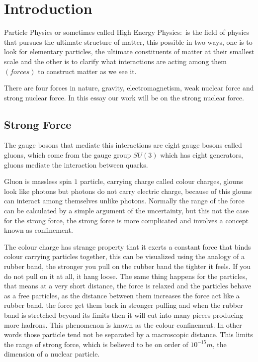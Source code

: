 \chapter{Introduction}
Particle Physics or sometimes called High Energy Physics$:$ is the field of physics that pursues the ultimate structure of matter, this possible in two ways, one is to look for elementary particles, the ultimate constituents of matter at their smallest scale and the other is to clarify what interactions are acting among them $(forces)$ to construct matter as we see it.
 
There are four forces in nature, gravity, electromagnetism, weak nuclear force and strong nuclear force. In this essay our work will be on the strong nuclear force. 

\section{Strong Force}
The gauge bosons that mediate this interactions are eight gauge bosons called gluons, which come from the gauge group $SU(3)$ which has eight generators, gluons mediate the interaction between quarks.

Gluon is massless spin $1$ particle, carrying charge called colour charges, glouns look like photons but photons do not carry electric charge, because of this glouns can interact among themselves unlike photons.
Normally the range of the force can be calculated by a simple argument of the uncertainty, but this not the case for the strong force, the strong force is more complicated and involves a concept known as confinement.

The colour charge has strange property that it exerts a constant force that binds colour carrying particles together, this can be visualized using the analogy of a rubber band, the stronger you pull on the rubber band the tighter it feels. If you do not pull on it at all, it hang loose. The same thing happens for the particles,  that   means at a very short distance, the force is relaxed and the particles behave as a free particles, as the distance between them increases the force act like a rubber band, the force get them back in stronger pulling and when the rubber band is stretched beyond its limits then it will cut into many pieces producing more hadrons.  This phenomenon is known as the colour confinement. In other words those particle tend not be separated by a macroscopic distance.  
This limits the range of strong force, which is believed to be on order of $10^{-15}m$, the dimension of a nuclear particle.

